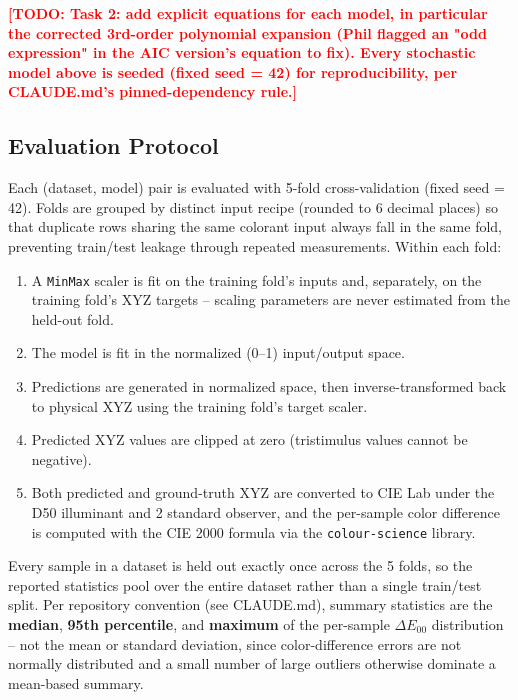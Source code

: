 \documentclass[11pt,a4paper]{article}
\newcommand{\todonote}[1]{\textcolor{red}{\textbf{[TODO: #1]}}}
\begin{document}
\todonote{Task 2: add explicit equations for each model, in particular the
corrected 3rd-order polynomial expansion (Phil flagged an "odd expression" in
the AIC version's equation to fix). Every stochastic model above is seeded
(fixed seed = 42) for reproducibility, per CLAUDE.md's pinned-dependency
rule.}

\subsection{Evaluation Protocol}
\label{sec:protocol}

Each (dataset, model) pair is evaluated with 5-fold cross-validation
(fixed seed = 42). Folds are grouped by distinct input recipe (rounded to
6 decimal places) so that duplicate rows sharing the same colorant input
always fall in the same fold, preventing train/test leakage through
repeated measurements. Within each fold:

\begin{enumerate}
\item A \texttt{MinMax} scaler is fit on the training fold's inputs and,
  separately, on the training fold's XYZ targets -- scaling parameters are
  never estimated from the held-out fold.
\item The model is fit in the normalized (0--1) input/output space.
\item Predictions are generated in normalized space, then inverse-transformed
  back to physical XYZ using the training fold's target scaler.
\item Predicted XYZ values are clipped at zero (tristimulus values cannot
  be negative).
\item Both predicted and ground-truth XYZ are converted to CIE Lab under the
  D50 illuminant and 2\textdegree{} standard observer, and the per-sample
  color difference is computed with the CIE 2000 formula
  \citep{sharma2005ciede2000} via the \texttt{colour-science} library.
\end{enumerate}

Every sample in a dataset is held out exactly once across the 5 folds, so
the reported statistics pool over the entire dataset rather than a single
train/test split. Per repository convention (see CLAUDE.md), summary
statistics are the \textbf{median}, \textbf{95th percentile}, and
\textbf{maximum} of the per-sample $\Delta E_{00}$ distribution -- not the
mean or standard deviation, since color-difference errors are not normally
distributed and a small number of large outliers otherwise dominate a
mean-based summary.
\end{document}
